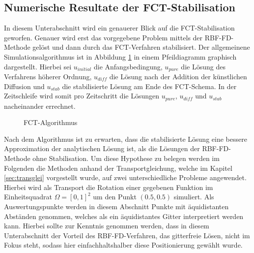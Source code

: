 \documentclass[12pt,titlepage]{article}
\begin{document}
\subsection{Numerische Resultate der FCT-Stabilisation}\label{sec:num_res_FCT}
In diesem Unterabschnitt wird ein genauerer Blick auf die FCT-Stabilisation geworfen. Genauer wird erst das vorgegebene Problem mittels der RBF-FD-Methode gelöst und dann durch das FCT-Verfahren stabilisiert. Der allgemeinene Simulationsalgorithmus ist in Abbildung \ref{fig:algorithmus} in einem Pfeildiagramm graphisch dargestellt. Hierbei sei $u_{initial}$  die Anfangsbedingung, $u_{pure}$ die Lösung des Verfahrens höherer Ordnung, $u_{diff}$ die Lösung nach der Addition der künstlichen Diffusion und $u_{stab}$ die stabilisierte Lösung am Ende des FCT-Schema. In der Zeitschleife wird somit pro Zeitschritt die Lösungen $u_{pure}$, $u_{diff}$ und $u_{stab}$ nacheinander errechnet.
\begin{figure}[H]
\centering
\caption{FCT-Algorithmus}
\label{fig:algorithmus}
\end{figure}
\noindent
Nach dem Algorithmus ist zu erwarten, dass die stabilisierte Lösung eine bessere Approximation der analytischen Lösung ist, als die Lösungen der RBF-FD-Methode ohne Stabilisation. Um diese Hypothese zu belegen werden im Folgenden die Methoden anhand der Transportgleichung, welche im Kapitel \ref{sec:transglei} vorgestellt wurde,  auf zwei unterschiedliche Probleme angewendet. Hierbei wird als Transport die Rotation einer gegebenen Funktion im Einheitsquadrat $\Omega=[0,1]^2$ um den Punkt $(0.5,0.5)$ simuliert. Als Auswertungspunkte werden in diesem Abschnitt Punkte mit äquidistanten Abständen genommen, welches als ein äquidistantes Gitter interpretiert werden kann. Hierbei sollte zur Kenntnis genommen werden, dass in diesem Unterabschnitt der Vorteil des RBF-FD-Verfahren, das gitterfreie Lösen, nicht im Fokus steht, sodass hier einfachhaltshalber diese Positionierung gewählt wurde.\\\\
\end{document}
